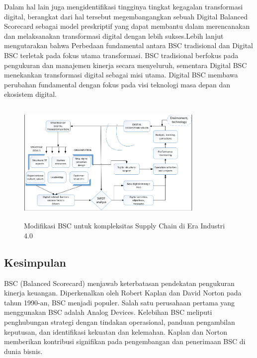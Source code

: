 \documentclass{article}
\begin{document}
Dalam hal lain juga \cite{Fabac2022} mengidentifikasi tingginya tingkat kegagalan transformasi digital, berangkat dari hal tersebut \cite{Fabac2022} megembangangkan sebuah Digital Balanced Scorecard sebagai model preskriptif yang dapat membantu dalam merencanakan dan melaksanakan transformasi digital dengan lebih sukses.Lebih lanjut \cite{Fabac2022} mengutarakan bahwa Perbedaan fundamental antara BSC tradisional dan Digital BSC terletak pada fokus utama transformasi. BSC tradisional berfokus pada pengukuran dan manajemen kinerja secara menyeluruh, sementara Digital BSC menekankan transformasi digital sebagai misi utama. Digital BSC membawa perubahan fundamental dengan fokus pada visi teknologi masa depan dan ekosistem digital.
\begin{figure}[htbp]
    \centering
    \includegraphics[width=0.8\textwidth,height=6cm]{D-BSC-MGMT}
    \caption{Modifikasi BSC untuk kompleksitas Supply Chain di Era Industri 4.0}
\end{figure}



\subsection*{Kesimpulan}
BSC (Balanced Scorecard) menjawab keterbatasan pendekatan pengukuran kinerja keuangan. Diperkenalkan oleh Robert Kaplan dan David Norton pada tahun 1990-an, BSC menjadi populer. Salah satu perusahaan pertama yang menggunakan BSC adalah Analog Devices. Kelebihan BSC meliputi penghubungan strategi dengan tindakan operasional, panduan pengambilan keputusan, dan identifikasi kekuatan dan kelemahan. Kaplan dan Norton memberikan kontribusi signifikan pada pengembangan dan penerimaan BSC di dunia bisnis.
\end{document}
